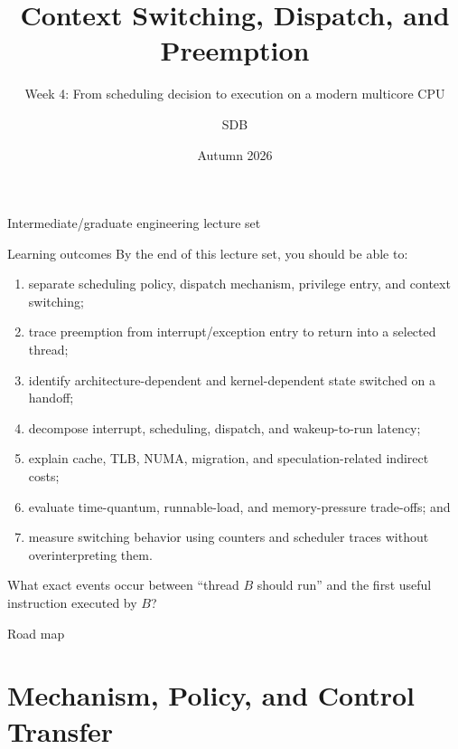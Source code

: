 \documentclass[aspectratio=169,11pt]{beamer}
\title[Context Switching and Dispatch]{Context Switching, Dispatch, and Preemption}
\subtitle{Week 4: From scheduling decision to execution on a modern multicore CPU}
\author[SDB]{SDB}
\date{Autumn 2026}
\begin{document}
\begin{frame}
  \titlepage
  \vspace{-1.2em}
  \begin{center}
    \small Intermediate/graduate engineering lecture set
  \end{center}
\end{frame}

\begin{frame}{Learning outcomes}
  By the end of this lecture set, you should be able to:
  \begin{enumerate}
    \item separate scheduling policy, dispatch mechanism, privilege entry, and context switching;
    \item trace preemption from interrupt/exception entry to return into a selected thread;
    \item identify architecture-dependent and kernel-dependent state switched on a handoff;
    \item decompose interrupt, scheduling, dispatch, and wakeup-to-run latency;
    \item explain cache, TLB, NUMA, migration, and speculation-related indirect costs;
    \item evaluate time-quantum, runnable-load, and memory-pressure trade-offs; and
    \item measure switching behavior using counters and scheduler traces without overinterpreting them.
  \end{enumerate}
  \begin{tcolorbox}[title=Guiding question,colback=osorange!5,colframe=osorange!70]
    What exact events occur between ``thread $B$ should run'' and the first useful instruction executed by $B$?
  \end{tcolorbox}
\end{frame}

\begin{frame}{Road map}
  \tableofcontents
\end{frame}

\section{Mechanism, Policy, and Control Transfer}
\end{document}
